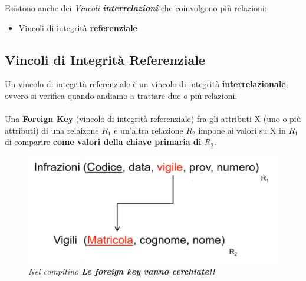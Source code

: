 \documentclass[12pt, a4paper]{article}
\begin{document}
    Esistono anche dei \textit{Vincoli \textbf{interrelazioni}} che coinvolgono più relazioni:
    \begin{itemize}
        \item Vincoli di integrità \textbf{referenziale}
    \end{itemize}

    \subsection{Vincoli di Integrità Referenziale}
    Un vincolo di integrità referenziale è un vincolo di integrità \textbf{interrelazionale}, ovvero si verifica quando andiamo
    a trattare due o più relazioni. 
    \\\\Una \textbf{Foreign Key} (vincolo di integrità referenziale) fra gli attributi X (uno o più attributi) di una relaizone $R_1$ e un'altra relazione $R_2$ impone ai valori 
    su X in $R_1$ di comparire \textbf{come valori della chiave primaria di $R_2$}.

    \begin{figure}[htbp]
        \centering
        \includegraphics[scale=0.5]{foreignkey.png}
        \\\textit{Nel compitino \textbf{Le foreign key vanno cerchiate!!}}
    \end{figure}
    
    
\end{document}
